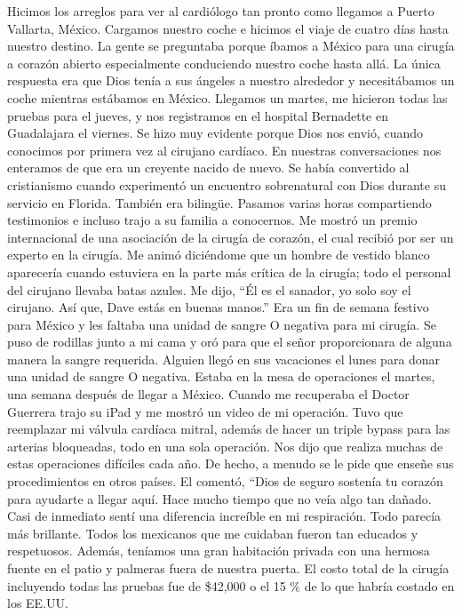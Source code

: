 \documentclass[twoside, 12pt]{book}
\begin{document}
Hicimos los arreglos para ver al cardiólogo tan pronto como llegamos a Puerto Vallarta, México. Cargamos nuestro coche e hicimos el viaje de cuatro días hasta nuestro destino. La gente se preguntaba porque íbamos a México para una cirugía a corazón abierto especialmente conduciendo nuestro coche hasta allá. La única respuesta era que Dios tenía a sus ángeles a nuestro alrededor y necesitábamos un coche mientras estábamos en México. Llegamos un martes, me hicieron todas las pruebas para el jueves, y nos registramos en el hospital Bernadette en Guadalajara el viernes. Se hizo muy evidente porque Dios nos envió, cuando conocimos por primera vez al cirujano cardíaco. En nuestras conversaciones nos enteramos de que era un creyente nacido de nuevo. Se había convertido al cristianismo cuando experimentó un encuentro sobrenatural con Dios durante su servicio en Florida. También era bilingüe. Pasamos varias horas compartiendo testimonios e incluso trajo a su familia a conocernos. Me mostró un premio internacional de una asociación de la cirugía de corazón, el cual recibió por ser un experto en la cirugía. Me animó diciéndome que un hombre de vestido blanco aparecería cuando estuviera en la parte más crítica de la cirugía; todo el personal del cirujano llevaba batas azules. Me dijo, “Él es el sanador, yo solo soy el cirujano. Así que, Dave estás en buenas manos.”
Era un fin de semana festivo para México y les faltaba una unidad de sangre O negativa para mi cirugía. Se puso de rodillas junto a mi cama y oró para que el señor proporcionara de alguna manera la sangre requerida. Alguien llegó en sus vacaciones el lunes para donar una unidad de sangre O negativa. Estaba en la mesa de operaciones el martes, una semana después de llegar a México. Cuando me recuperaba el Doctor Guerrera trajo su iPad y me mostró un video de mi operación. Tuvo que reemplazar mi válvula cardíaca mitral, además de hacer un triple bypass para las arterias bloqueadas, todo en una sola operación. Nos dijo que realiza muchas de estas operaciones difíciles cada año.  De hecho, a menudo se le pide que enseñe sus procedimientos en otros países. El comentó, “Dios de seguro sostenía tu corazón para ayudarte a llegar aquí. Hace mucho tiempo que no veía algo tan dañado. Casi de inmediato sentí una diferencia increíble en mi respiración. Todo parecía más brillante. Todos los mexicanos que me cuidaban fueron tan educados y respetuosos. Además, teníamos una gran habitación privada con una hermosa fuente en el patio y palmeras fuera de nuestra puerta. El costo total de la cirugía incluyendo todas las pruebas fue de \$42,000 o el 15 \% de lo que habría costado en los EE.UU.\\
\end{document}
